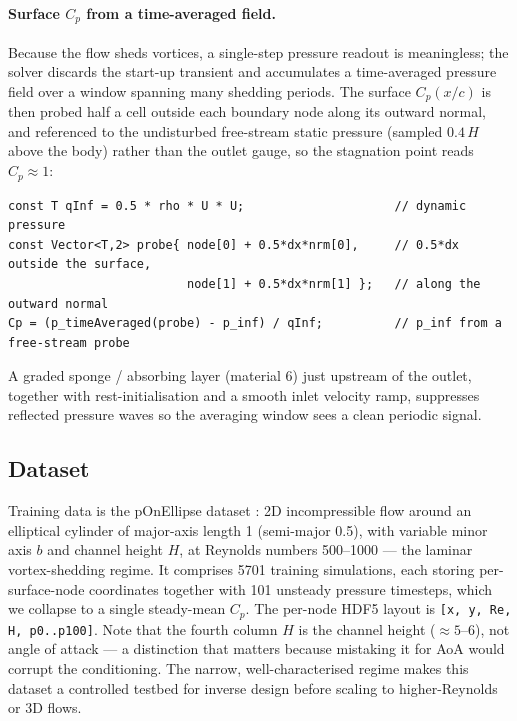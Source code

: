 \paragraph{Surface $C_p$ from a time-averaged field.} Because the flow sheds vortices, a single-step
pressure readout is meaningless; the solver discards the start-up transient and accumulates a
time-averaged pressure field over a window spanning many shedding periods. The surface $C_p(x/c)$ is
then probed half a cell outside each boundary node along its outward normal, and referenced to the
undisturbed free-stream static pressure (sampled $0.4\,H$ above the body) rather than the outlet gauge,
so the stagnation point reads $C_p \approx 1$:

\begin{lstlisting}[style=cpp]
const T qInf = 0.5 * rho * U * U;                     // dynamic pressure
const Vector<T,2> probe{ node[0] + 0.5*dx*nrm[0],     // 0.5*dx outside the surface,
                         node[1] + 0.5*dx*nrm[1] };   // along the outward normal
Cp = (p_timeAveraged(probe) - p_inf) / qInf;          // p_inf from a free-stream probe
\end{lstlisting}

A graded sponge / absorbing layer \cite{xu2013sponge} (material 6) just upstream of the outlet, together
with rest-initialisation and a smooth inlet velocity ramp, suppresses reflected pressure waves so the
averaging window sees a clean periodic signal.

\subsection{Dataset}

Training data is the pOnEllipse dataset \cite{lino2022msgnn}: 2D incompressible flow around an
elliptical cylinder of major-axis length 1 (semi-major 0.5), with variable minor axis $b$ and
channel height $H$, at Reynolds numbers 500--1000 --- the laminar vortex-shedding regime. It
comprises 5701 training simulations, each storing per-surface-node coordinates together with 101
unsteady pressure timesteps, which we collapse to a single steady-mean $C_p$. The per-node HDF5
layout is \texttt{[x, y, Re, H, p0..p100]}. Note that the fourth column $H$ is the channel height
($\approx 5$--6), not angle of attack --- a distinction that matters because mistaking it for AoA
would corrupt the conditioning. The narrow, well-characterised regime makes this dataset a
controlled testbed for inverse design before scaling to higher-Reynolds or 3D flows.

